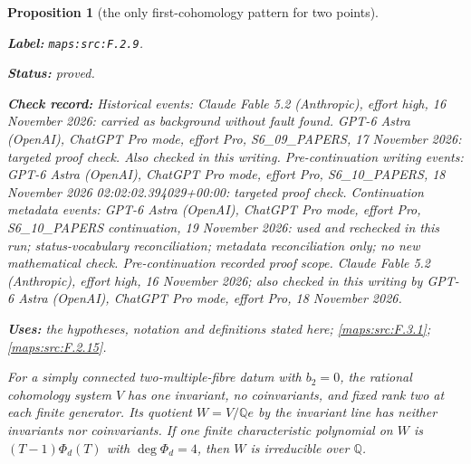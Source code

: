 \documentclass[11pt,a4paper]{article}
\newtheorem{proposition}[proposition]{Proposition}
\theoremstyle{definition}
\newcommand{\StatementRecord}[4]{\par\smallskip\begingroup\upshape\raggedright\noindent\textbf{Label:} \nolinkurl{#1}.\par\noindent\textbf{Status:} #2.\par\noindent\textbf{Check record:} #3.\par\noindent\textbf{Uses:} #4.\par\endgroup\smallskip}
\begin{document}
\begin{proposition}[the only first-cohomology pattern for two points]\label{maps:src:F.2.9}
\StatementRecord{maps:src:F.2.9}{proved}{Historical events: Claude Fable 5.2 (Anthropic), effort high, 16 November 2026: carried as background without fault found. GPT-6 Astra (OpenAI), ChatGPT Pro mode, effort Pro, S6\_09\_PAPERS, 17 November 2026: targeted proof check. Also checked in this writing. Pre-continuation writing events: GPT-6 Astra (OpenAI), ChatGPT Pro mode, effort Pro, S6\_10\_PAPERS, 18 November 2026 02:02:02.394029+00:00: targeted proof check. Continuation metadata events: GPT-6 Astra (OpenAI), ChatGPT Pro mode, effort Pro, S6\_10\_PAPERS continuation, 19 November 2026: used and rechecked in this run; status-vocabulary reconciliation; metadata reconciliation only; no new mathematical check. \emph{Pre-continuation recorded proof scope.} Claude Fable 5.2 (Anthropic), effort high, 16 November 2026; also checked in this writing by GPT-6 Astra (OpenAI), ChatGPT Pro mode, effort Pro, 18 November 2026}{the hypotheses, notation and definitions stated here; \cref{maps:src:F.3.1}; \cref{maps:src:F.2.15}}


For a simply connected two-multiple-fibre datum with $b_2=0$,
the rational
cohomology system $V$ has one invariant, no coinvariants,
and fixed rank two at each finite generator.  Its quotient
$W=V/\mathbb Qe$ by the invariant line has neither invariants
nor coinvariants.  If one finite characteristic polynomial
on $W$ is $(T-1)\Phi_d(T)$ with $\deg\Phi_d=4$, then $W$
is irreducible over $\mathbb Q$.

\end{proposition}
\end{document}
